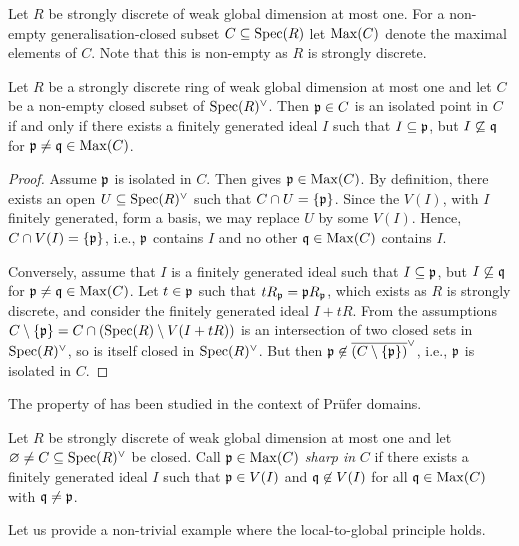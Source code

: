 \documentclass[reqno,a4paper]{amsart}
\begin{document}
\begin{notation}
    Let $R$ be strongly discrete of weak global dimension at most one. For a non-empty generalisation-closed subset $C\subseteq\operatorname{Spec}(R)$ let $\operatorname{Max}(C)$ denote the maximal elements of $C$. Note that this is non-empty as $R$ is strongly discrete.
\end{notation}
\begin{lemma}\label{rem:sharp}
    Let $R$ be a strongly discrete ring of weak global dimension at most one and let $C$ be a non-empty closed subset of $\operatorname{Spec}(R)^\vee$. Then $\mathfrak{p}\in C$ is an isolated point in $C$ if and only if there exists a finitely generated ideal $I$ such that $I\subseteq \mathfrak{p}$, but $I\not\subseteq\mathfrak{q}$ for $\mathfrak{p}\neq\mathfrak{q}\in\operatorname{Max}(C)$. 
\end{lemma}
\begin{proof}
    Assume $\mathfrak{p}$ is isolated in $C$. Then  gives $\mathfrak{p}\in\operatorname{Max}(C)$. By definition, there exists an open $U\subseteq\operatorname{Spec}(R)^\vee$ such that $C\cap U=\{\mathfrak{p}\}$. Since the $V(I)$, with $I$ finitely generated, form a basis, we may replace $U$ by some $V(I)$. Hence, $C\cap V(I)=\{\mathfrak{p}\}$, i.e., $\mathfrak{p}$ contains $I$ and no other $\mathfrak{q}\in\operatorname{Max}(C)$ contains $I$.
    
    Conversely, assume that $I$ is a finitely generated ideal such that $I\subseteq \mathfrak{p}$, but $I\not\subseteq\mathfrak{q}$ for $\mathfrak{p}\neq\mathfrak{q}\in\operatorname{Max}(C)$. 
    Let $t\in \mathfrak{p}$ such that $tR_{\mathfrak{p}}=\mathfrak{p} R_{\mathfrak{p}}$, which exists as $R$ is strongly discrete, and consider the finitely generated ideal $I+tR$. From the assumptions $C\setminus \{\mathfrak{p}\}=C\cap (\operatorname{Spec}(R)\setminus V(I+tR))$ is an intersection of two closed sets in $\operatorname{Spec}(R)^\vee$, so is itself closed in $\operatorname{Spec}(R)^\vee$.
    But then $\mathfrak{p}\not\in\overline{(C\setminus\{\mathfrak{p}\})}^{\vee}$, i.e., $\mathfrak{p}$ is isolated in $C$.
\end{proof}
The property of  has been studied in the context of Prüfer domains.
\begin{definition}\label{def:sharp}
    Let $R$ be strongly discrete of weak global dimension at most one and let $\varnothing\neq C\subseteq\operatorname{Spec}(R)^\vee$ be closed. Call $\mathfrak{p}\in\operatorname{Max}(C)$ {\it sharp in }$C$ if there exists a finitely generated ideal $I$ such that $\mathfrak{p}\in V(I)$ and $\mathfrak{q}\not\in V(I)$ for all $\mathfrak{q}\in\operatorname{Max}(C)$ with $\mathfrak{q}\neq\mathfrak{p}$.
\end{definition}
Let us provide a non-trivial example where the local-to-global principle holds.
\end{document}
